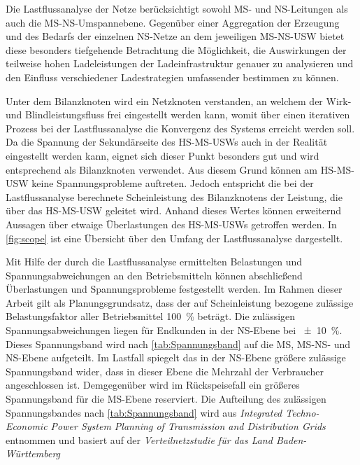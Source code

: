 Die Lastflussanalyse der Netze berücksichtigt sowohl \gls{MS}- und \gls{NS}-Leitungen als auch die \gls{MS}-\gls{NS}-Umspannebene.
Gegenüber einer Aggregation der Erzeugung und des Bedarfs der einzelnen \gls{NS}-Netze an dem jeweiligen \gls{MS}-\gls{NS}-\gls{USW} bietet diese besonders tiefgehende Betrachtung die Möglichkeit, die Auswirkungen der teilweise hohen Ladeleistungen der Ladeinfrastruktur genauer zu analysieren und den Einfluss verschiedener Ladestrategien umfassender bestimmen zu können.\medskip

Unter dem Bilanzknoten wird ein Netzknoten verstanden, an welchem der Wirk- und Blindleistungsfluss frei eingestellt werden kann, womit über einen iterativen Prozess bei der Lastflussanalyse die Konvergenz des Systems erreicht werden soll.
Da die Spannung der Sekundärseite des \gls{HS}-\gls{MS}-\glspl{USW} auch in der Realität eingestellt werden kann, eignet sich dieser Punkt besonders gut und wird entsprechend als Bilanzknoten verwendet.
Aus diesem Grund können am \gls{HS}-\gls{MS}-\gls{USW} keine Spannungsprobleme auftreten.
Jedoch entspricht die bei der Lastflussanalyse berechnete Scheinleistung des Bilanzknotens der Leistung, die über das \gls{HS}-\gls{MS}-\gls{USW} geleitet wird.
Anhand dieses Wertes können erweiternd Aussagen über etwaige Überlastungen des \gls{HS}-\gls{MS}-\glspl{USW} getroffen werden.
In \autoref{fig:scope} ist eine Übersicht über den Umfang der Lastflussanalyse dargestellt. \cite{Schachler}



Mit Hilfe der durch die Lastflussanalyse ermittelten Belastungen und Spannungsabweichungen an den Betriebsmitteln können abschließend Überlastungen und Spannungsprobleme festgestellt werden.
Im Rahmen dieser Arbeit gilt als Planungsgrundsatz, dass der auf Scheinleistung bezogene zulässige Belastungsfaktor aller Betriebsmittel \SI{100}{\percent} beträgt.
Die zulässigen Spannungsabweichungen liegen für Endkunden in der \gls{NS}-Ebene bei \SI{\pm 10}{\percent}.
Dieses Spannungsband wird nach \autoref{tab:Spannungsband} auf die \gls{MS}, \gls{MS}-\gls{NS}- und \gls{NS}-Ebene aufgeteilt.
Im Lastfall spiegelt das in der \gls{NS}-Ebene größere zulässige Spannungsband wider, dass in dieser Ebene die Mehrzahl der Verbraucher angeschlossen ist.
Demgegenüber wird im Rückspeisefall ein größeres Spannungsband für die \gls{MS}-Ebene reserviert.
Die Aufteilung des zulässigen Spannungsbandes nach \autoref{tab:Spannungsband} wird aus \textit{Integrated Techno-Economic Power System Planning of Transmission and Distribution Grids} \cite{Mueller2019a} entnommen und basiert auf der \textit{Verteilnetzstudie für das Land Baden-Württemberg} \cite{Rehtanz2017}


